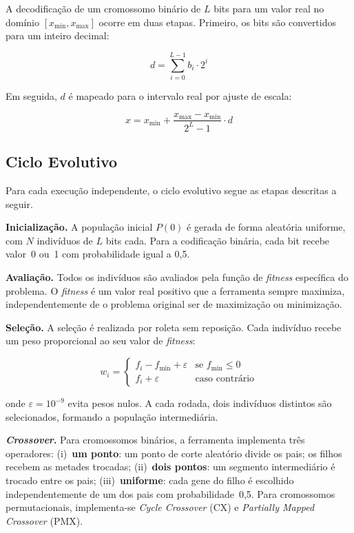 \documentclass[12pt,twocolumn]{article}
\begin{document}
A decodificação de um cromossomo binário de $L$ bits para um valor real no domínio
$[x_{\min}, x_{\max}]$ ocorre em duas etapas. Primeiro, os bits são convertidos para
um inteiro decimal:

\begin{equation}
  d = \sum_{i=0}^{L-1} b_i \cdot 2^i
  \label{eq:bin2dec}
\end{equation}

Em seguida, $d$ é mapeado para o intervalo real por ajuste de escala:

\begin{equation}
  x = x_{\min} + \frac{x_{\max} - x_{\min}}{2^L - 1} \cdot d
  \label{eq:scale}
\end{equation}

\subsection{Ciclo Evolutivo}

Para cada execução independente, o ciclo evolutivo segue as etapas descritas a seguir.

\textbf{Inicialização.} A população inicial $P(0)$ é gerada de forma aleatória uniforme,
com $N$ indivíduos de $L$ bits cada. Para a codificação binária, cada bit recebe valor~0
ou~1 com probabilidade igual a 0,5.

\textbf{Avaliação.} Todos os indivíduos são avaliados pela função de \textit{fitness}
específica do problema. O \textit{fitness} é um valor real positivo que a ferramenta
sempre maximiza, independentemente de o problema original ser de maximização ou
minimização.

\textbf{Seleção.} A seleção é realizada por roleta sem reposição. Cada indivíduo recebe
um peso proporcional ao seu valor de \textit{fitness}:

\begin{equation}
  w_i = \begin{cases}
    f_i - f_{\min} + \varepsilon & \text{se } f_{\min} \le 0 \\
    f_i + \varepsilon & \text{caso contrário}
  \end{cases}
  \label{eq:roleta}
\end{equation}

\noindent onde $\varepsilon = 10^{-9}$ evita pesos nulos. A cada rodada, dois indivíduos
distintos são selecionados, formando a população intermediária.

\textbf{\textit{Crossover}.} Para cromossomos binários, a ferramenta implementa três
operadores: (i)~\textbf{um ponto}: um ponto de corte aleatório divide os pais; os filhos
recebem as metades trocadas; (ii)~\textbf{dois pontos}: um segmento intermediário é
trocado entre os pais; (iii)~\textbf{uniforme}: cada gene do filho é escolhido
independentemente de um dos pais com probabilidade~0,5. Para cromossomos permutacionais,
implementa-se \textit{Cycle Crossover} (CX) e \textit{Partially Mapped Crossover} (PMX).
\end{document}
